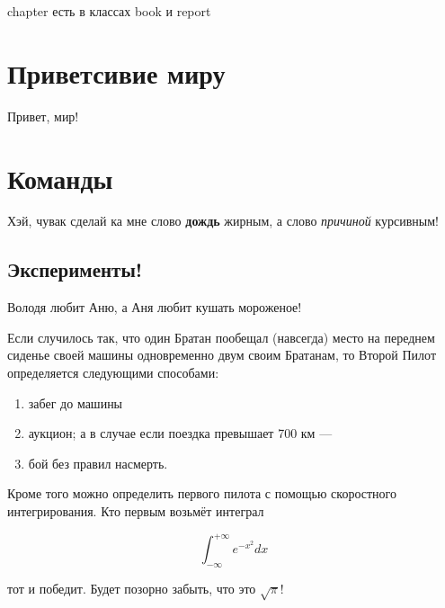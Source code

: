 \documentclass[12pt, a4paper]{article}
\begin{document}

chapter есть в классах book и report

\tableofcontents


\section{Приветсивие миру}
Привет, мир! 

\section{Команды}

Хэй, чувак сделай ка мне слово \textbf{дождь} жирным, а слово \textit{причиной} курсивным!

\subsection{Эксперименты!}

Володя любит          Аню, а Аня любит   кушать мороженое! 

Если случилось так, что один Братан пообещал (навсегда) место на переднем сиденье своей машины одновременно двум своим Братанам, то Второй Пилот определяется следующими способами:



\begin{enumerate}
\item забег до машины
\item аукцион; а в случае если поездка превышает 700 км ---
\item бой без правил насмерть.  %
\end{enumerate}

Кроме того можно определить первого пилота с помощью скоростного интегрирования. Кто первым возьмёт интеграл 

\[ \int_{-\infty}^{+\infty} e^{-x^2} dx \] 

тот и победит. Будет позорно забыть, что это $\sqrt{\pi}$!
\end{document}
